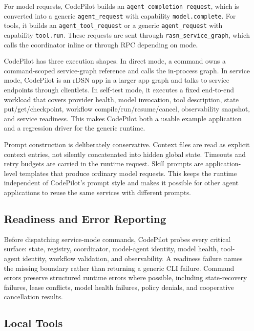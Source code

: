 \documentclass[manuscript,screen,review]{acmart}
\newcommand{\codepilot}{CodePilot\xspace}
\begin{document}
For model requests, \codepilot builds an \texttt{agent\_completion\_request},
which is converted into a generic \texttt{agent\_request} with capability
\texttt{model.complete}. For tools, it builds an \texttt{agent\_tool\_request}
or a generic \texttt{agent\_request} with capability \texttt{tool.run}. These
requests are sent through \texttt{rasn\_service\_graph}, which calls the
coordinator inline or through RPC depending on mode.

\codepilot has three execution shapes. In direct mode, a command owns a
command-scoped service-graph reference and calls the in-process graph. In
service mode, \codepilot is an rDSN app in a larger app graph and talks to
service endpoints through clientlets. In self-test mode, it executes a fixed
end-to-end workload that covers provider health, model invocation, tool
description, state put/get/checkpoint, workflow compile/run/resume/cancel,
observability snapshot, and service readiness. This makes \codepilot both a
usable example application and a regression driver for the generic runtime.

Prompt construction is deliberately conservative. Context files are read as
explicit context entries, not silently concatenated into hidden global state.
Timeouts and retry budgets are carried in the runtime request. Skill prompts are
application-level templates that produce ordinary model requests. This keeps the
runtime independent of CodePilot's prompt style and makes it possible for other
agent applications to reuse the same services with different prompts.

\subsection{Readiness and Error Reporting}

Before dispatching service-mode commands, \codepilot probes every critical
surface: state, registry, coordinator, model-agent identity, model health,
tool-agent identity, workflow validation, and observability. A readiness failure
names the missing boundary rather than returning a generic CLI failure. Command
errors preserve structured runtime errors where possible, including
state-recovery failures, lease conflicts, model health failures, policy denials,
and cooperative cancellation results.

\subsection{Local Tools}
\end{document}
